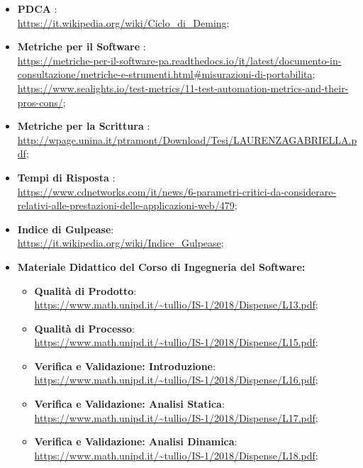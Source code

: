 	\begin{itemize}
		\item \textbf{PDCA} :\\ \url{https://it.wikipedia.org/wiki/Ciclo_di_Deming};
		\item \textbf{Metriche per il Software} :\\
				\url{https://metriche-per-il-software-pa.readthedocs.io/it/latest/documento-in-consultazione/metriche-e-strumenti.html#misurazioni-di-portabilita};\\
				\url{https://www.sealights.io/test-metrics/11-test-automation-metrics-and-their-pros-cons/};
		\item \textbf{Metriche per la Scrittura} :\\\url{http://wpage.unina.it/ptramont/Download/Tesi/LAURENZAGABRIELLA.pdf};
		\item \textbf{Tempi di Risposta} :\\ \url{https://www.cdnetworks.com/it/news/6-parametri-critici-da-considerare-relativi-alle-prestazioni-delle-applicazioni-web/479};
		\item \textbf{Indice di Gulpease}: \\ \url{https://it.wikipedia.org/wiki/Indice_Gulpease};
		
		
		\item \textbf{Materiale Didattico del Corso di Ingegneria del Software:}
			\begin{itemize}
				\item \textbf{Qualità di Prodotto}: \\ \url{https://www.math.unipd.it/~tullio/IS-1/2018/Dispense/L13.pdf};
				
				\item \textbf{Qualità di Processo}: \\ \url{https://www.math.unipd.it/~tullio/IS-1/2018/Dispense/L15.pdf};
				
				\item \textbf{Verifica e Validazione: Introduzione}: \\ \url{https://www.math.unipd.it/~tullio/IS-1/2018/Dispense/L16.pdf};
				
				\item \textbf{Verifica e Validazione: Analisi Statica}: \\ \url{https://www.math.unipd.it/~tullio/IS-1/2018/Dispense/L17.pdf};
				\item \textbf{Verifica e Validazione: Analisi Dinamica}: \\ \url{https://www.math.unipd.it/~tullio/IS-1/2018/Dispense/L18.pdf};
			\end{itemize}
			

\end{itemize}
